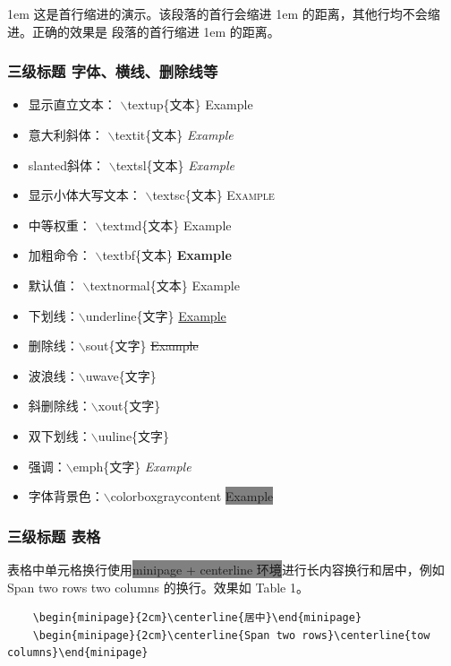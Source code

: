 \documentclass[a4paper,11pt,onecolumn]{article}
\begin{document}
\parindent 1em
这是首行缩进的演示。该段落的首行会缩进 1em 的距离，其他行均不会缩进。正确的效果是
段落的首行缩进 1em 的距离。
\subsubsection{三级标题 字体、横线、删除线等}
\begin{itemize}
  \item 显示直立文本： $\backslash$textup\{文本\} \textup{Example}
  \item 意大利斜体： $\backslash$textit\{文本\} \textit{Example}
  \item slanted斜体： $\backslash$textsl\{文本\} \textsl{Example}
  \item 显示小体大写文本： $\backslash$textsc\{文本\} \textsc{Example}
  \item 中等权重： $\backslash$textmd\{文本\} \textmd{Example}
  \item 加粗命令： $\backslash$textbf\{文本\} \textbf{Example}
  \item 默认值： $\backslash$textnormal\{文本\} \textnormal{Example}
  \item 下划线：$\backslash$underline\{文字\} \underline{Example}
  \item 删除线：$\backslash$sout\{文字\} \sout{Example}
  \item 波浪线：$\backslash$uwave\{文字\} 
  \item 斜删除线：$\backslash$xout\{文字\} 
  \item 双下划线：$\backslash$uuline\{文字\} 
  \item 强调：$\backslash$emph\{文字\} \emph{Example}
  \item 字体背景色：$\backslash$colorbox{gray}{content} \colorbox{gray}{Example}
\end{itemize}
\subsubsection{三级标题 表格}
表格中单元格换行使用\colorbox{gray}{minipage + centerline 环境}进行长内容换行和居中，例如 Span two rows two columns 的换行。效果如 Table 1。
  \begin{lstlisting}
    \begin{minipage}{2cm}\centerline{居中}\end{minipage}
    \begin{minipage}{2cm}\centerline{Span two rows}\centerline{tow columns}\end{minipage}
  \end{lstlisting}
\end{document}
